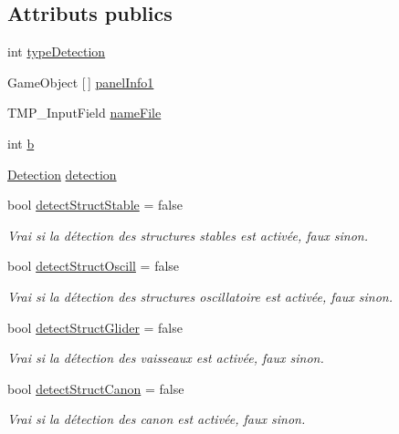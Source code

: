 \subsection*{Attributs publics}
\begin{DoxyCompactItemize}
\item 
int \mbox{\hyperlink{class_parameters_a0c0451581ea7d4705f895a49a20519a8}{type\+Detection}}
\item 
Game\+Object \mbox{[}$\,$\mbox{]} \mbox{\hyperlink{class_parameters_a21e4cca4e061b650741354680361136c}{panel\+Info1}}
\item 
T\+M\+P\+\_\+\+Input\+Field \mbox{\hyperlink{class_parameters_a70300043b336ebaf786ae92efe9d215f}{name\+File}}
\item 
int \mbox{\hyperlink{class_parameters_a701b55ad59ff4744ae7e95139c703145}{b}}
\item 
\mbox{\hyperlink{class_detection}{Detection}} \mbox{\hyperlink{class_parameters_a9b194f58924fececb4ffef5afb6d7334}{detection}}
\item 
bool \mbox{\hyperlink{class_parameters_a9cee3a4a38b1085ad46833289acf1336}{detect\+Struct\+Stable}} = false
\begin{DoxyCompactList}\small\item\em Vrai si la détection des structures stables est activée, faux sinon. \end{DoxyCompactList}\item 
bool \mbox{\hyperlink{class_parameters_a861434feae8c97b839615973c0e0e2ec}{detect\+Struct\+Oscill}} = false
\begin{DoxyCompactList}\small\item\em Vrai si la détection des structures oscillatoire est activée, faux sinon. \end{DoxyCompactList}\item 
bool \mbox{\hyperlink{class_parameters_a4785fe04733d4ef9e76e314ca2fc120c}{detect\+Struct\+Glider}} = false
\begin{DoxyCompactList}\small\item\em Vrai si la détection des vaisseaux est activée, faux sinon. \end{DoxyCompactList}\item 
bool \mbox{\hyperlink{class_parameters_a87a3d90929121cd0f27d1aeb55551dcc}{detect\+Struct\+Canon}} = false
\begin{DoxyCompactList}\small\item\em Vrai si la détection des canon est activée, faux sinon. \end{DoxyCompactList}\item 

\end{DoxyCompactItemize}
